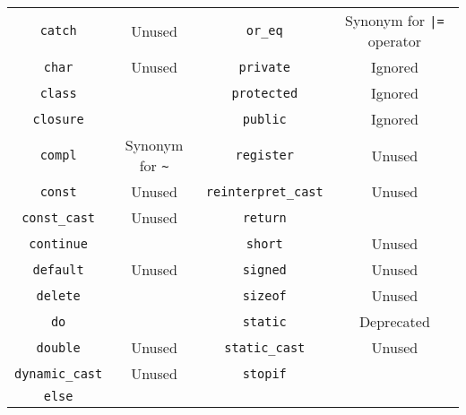 \begin{table}[\floatpos]
\begin{tabular}{|c|c||c|c|}
    \lstinline"catch"             & Unused                                  &
    \lstinline"or_eq"             & Synonym for \lstinline-|=- operator     \\
    \lstinline"char"              & Unused                                  &
    \lstinline"private"           & Ignored                                 \\
    \lstinline"class"             &                                         &
    \lstinline"protected"         & Ignored                                 \\
    \lstinline"closure"           &                                         &
    \lstinline"public"            & Ignored                                 \\
    \lstinline"compl"             & Synonym for \lstinline|~|               &
    \lstinline"register"          & Unused                                  \\
    \lstinline"const"             & Unused                                  &
    \lstinline"reinterpret_cast"  & Unused                                 \\
    \lstinline"const_cast"        & Unused                                  &
    \lstinline"return"            &                                         \\
    \lstinline"continue"          &                                         &
    \lstinline"short"             & Unused                                  \\
    \lstinline"default"           & Unused                                  &
    \lstinline"signed"            & Unused                                  \\
    \lstinline"delete"            &                                         &
    \lstinline"sizeof"            & Unused                                  \\
    \lstinline"do"                &                                         &
    \lstinline"static"            & Deprecated                              \\
    \lstinline"double"            & Unused                                  &
    \lstinline"static_cast"       & Unused                                  \\
    \lstinline"dynamic_cast"      & Unused                                  &
    \lstinline"stopif"            &                                         \\
    \lstinline"else"              &                                         &

\end{tabular}
\end{table}
